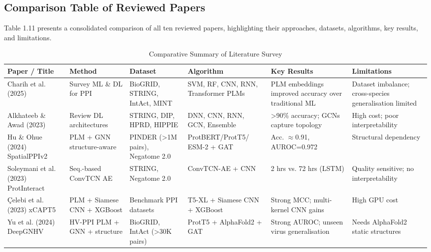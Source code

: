 \documentclass[12pt,a4paper]{report}
\begin{document}
\usepackage{pdflscape}
\begin{landscape}
\section{Comparison Table of Reviewed Papers}
Table 1.11 presents a consolidated comparison of all ten reviewed papers, highlighting their approaches, datasets, algorithms, key results, and limitations.

\begin{table}[H]
\caption{Comparative Summary of Literature Survey}
\centering
\small
\begin{tabular}{|p{}|p{}|p{}|p{}|p{}|p{}|}
\hline
\textbf{Paper / Title} & \textbf{Method} & \textbf{Dataset} & \textbf{Algorithm} & \textbf{Key Results} & \textbf{Limitations} \\ \hline
Charih et al. (2025) & Survey ML \& DL for PPI & BioGRID, STRING, IntAct, MINT & SVM, RF, CNN, RNN, Transformer PLMs & PLM embeddings improved accuracy over traditional ML & Dataset imbalance; cross-species generalisation limited \\ \hline
Alkhateeb \& Awad (2023) & Review DL architectures & STRING, DIP, HPRD, HIPPIE & DNN, CNN, RNN, GCN, Ensemble & >90\% accuracy; GCNs capture topology & High cost; poor interpretability \\ \hline
Hu \& Ohue (2024) SpatialPPIv2 & PLM + GNN structure-aware & PINDER (>1M pairs), Negatome 2.0 & ProtBERT/ProtT5/ ESM-2 + GAT & Acc. $\approx$0.91, AUROC=0.972 & Structural dependency \\ \hline
Soleymani et al. (2023) ProtInteract & Seq.-based ConvTCN AE & STRING, Negatome 2.0 & ConvTCN-AE + CNN & 2 hrs vs. 72 hrs (LSTM) & Quality sensitive; no interpretability \\ \hline
\c{C}elebi et al. (2023) xCAPT5 & PLM + Siamese CNN + XGBoost & Benchmark PPI datasets & T5-XL + Siamese CNN + XGBoost & Strong MCC; multi-kernel CNN gains & High GPU cost \\ \hline
Yu et al. (2024) DeepGNHV & HV-PPI PLM + GNN + structure & BioGRID, IntAct (>30K pairs) & ProtT5 + AlphaFold2 + GAT & Strong AUROC; unseen virus generalisation & Needs AlphaFold2 static structures \\ \hline
\end{tabular}
\end{table}
\end{landscape}
\end{document}
